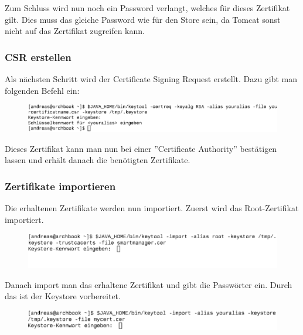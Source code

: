 Zum Schluss wird nun noch ein Password verlangt, welches für dieses Zertifikat gilt. Dies muss das gleiche Password wie für den Store sein, da Tomcat sonst nicht auf das Zertifikat zugreifen kann.

\subsubsection{CSR erstellen}
Als nächsten Schritt wird der Certificate Signing Request erstellt. Dazu gibt man folgenden Befehl ein:
\begin{figure}[H]
\centering
\includegraphics[scale=0.65]{../05_Schlussbericht/images/keystore3.png}
\end{figure}


Dieses Zertifikat kann man nun bei einer ''Certificate Authority'' bestätigen lassen und erhält danach die benötigten Zertifikate.
\subsubsection{Zertifikate importieren}
Die erhaltenen Zertifikate werden nun importiert. Zuerst wird das Root-Zertifikat importiert.
\begin{figure}[H]
\centering
\includegraphics[scale=0.65]{../05_Schlussbericht/images/keystore4.png}
\end{figure}

Danach import man das erhaltene Zertifikat und gibt die Passwörter ein. Durch das ist der Keystore vorbereitet.
\begin{figure}[H]
\centering
\includegraphics[scale=0.4]{../05_Schlussbericht/images/keystore5.png}
\end{figure}
